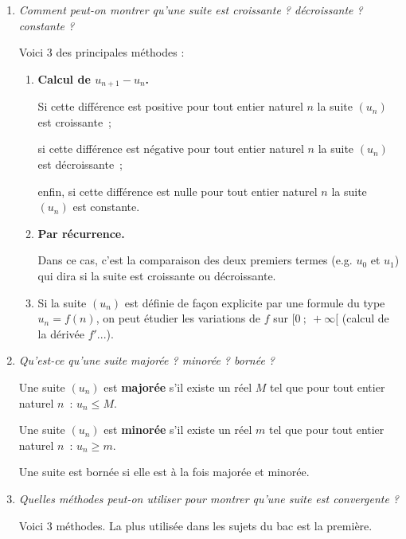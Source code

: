 \begin{reponses}
     \begin{enumerate}
          \item %
          \textit{Comment peut-on montrer qu'une suite est croissante ? décroissante ? constante ?}
          \par
          Voici 3 des principales méthodes :
          \begin{enumerate}[label=\alph*.]
               \item %
               \textbf{Calcul de $u_{n+1}-u_n$.}
               \par
               Si cette différence est positive pour tout entier naturel $n$ la suite $(u_n)$ est croissante~;
               \par
               si cette différence est négative pour tout entier naturel $n$ la suite $(u_n)$ est décroissante~;
               \par
               enfin, si cette différence est nulle pour tout entier naturel $n$ la suite $(u_n)$ est constante.
               \item %
               \textbf{Par récurrence.}
               \par
               Dans ce cas, c'est la comparaison des deux premiers termes (e.g. $u_0$ et $u_1$) qui dira si la suite est croissante ou décroissante.
               \item %
               Si la suite $(u_n)$ est définie de façon explicite par une formule du type $u_n=f(n)$, on peut étudier les variations de $f$ sur $[0~;~+\infty[$ (calcul de la dérivée $f'$...).
          \end{enumerate}
          \item %
          \textit{Qu'est-ce qu'une suite majorée ? minorée ? bornée ?}
          \par
          Une suite $(u_n)$ est \textbf{majorée} s'il existe un réel $M$ tel que pour tout entier naturel $n$~: $u_n \leqslant M$.
          \par
          Une suite $(u_n)$ est \textbf{minorée} s'il existe un réel $m$ tel que pour tout entier naturel $n$~: $u_n \geqslant m$.
          \par
          Une suite est bornée si elle est à la fois majorée et minorée.
          \item %
          \textit{Quelles méthodes peut-on utiliser pour montrer qu'une suite est convergente ?}
          \par
          Voici 3 méthodes. La plus utilisée dans les sujets du bac est la première.

\end{enumerate}
\end{reponses}
